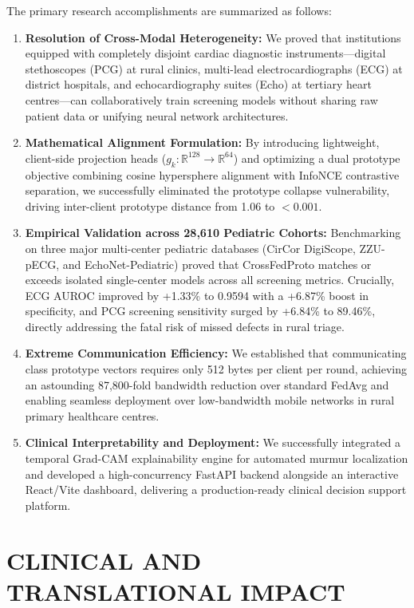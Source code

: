 \documentclass[12pt,a4paper]{amritareport}
\begin{document}
The primary research accomplishments are summarized as follows:
\begin{enumerate}
	\item \textbf{Resolution of Cross-Modal Heterogeneity:} We proved that institutions equipped with completely disjoint cardiac diagnostic instruments—digital stethoscopes (PCG) at rural clinics, multi-lead electrocardiographs (ECG) at district hospitals, and echocardiography suites (Echo) at tertiary heart centres—can collaboratively train screening models without sharing raw patient data or unifying neural network architectures.
	\item \textbf{Mathematical Alignment Formulation:} By introducing lightweight, client-side projection heads ($g_k: \mathbb{R}^{128} \to \mathbb{R}^{64}$) and optimizing a dual prototype objective combining cosine hypersphere alignment with InfoNCE contrastive separation, we successfully eliminated the prototype collapse vulnerability, driving inter-client prototype distance from 1.06 to $< 0.001$.
	\item \textbf{Empirical Validation across 28,610 Pediatric Cohorts:} Benchmarking on three major multi-center pediatric databases (CirCor DigiScope, ZZU-pECG, and EchoNet-Pediatric) proved that CrossFedProto matches or exceeds isolated single-center models across all screening metrics. Crucially, ECG AUROC improved by +1.33\% to 0.9594 with a +6.87\% boost in specificity, and PCG screening sensitivity surged by +6.84\% to 89.46\%, directly addressing the fatal risk of missed defects in rural triage.
	\item \textbf{Extreme Communication Efficiency:} We established that communicating class prototype vectors requires only 512 bytes per client per round, achieving an astounding 87,800-fold bandwidth reduction over standard FedAvg and enabling seamless deployment over low-bandwidth mobile networks in rural primary healthcare centres.
	\item \textbf{Clinical Interpretability and Deployment:} We successfully integrated a temporal Grad-CAM explainability engine for automated murmur localization and developed a high-concurrency FastAPI backend alongside an interactive React/Vite dashboard, delivering a production-ready clinical decision support platform.
\end{enumerate}


\section{CLINICAL AND TRANSLATIONAL IMPACT}
\end{document}
